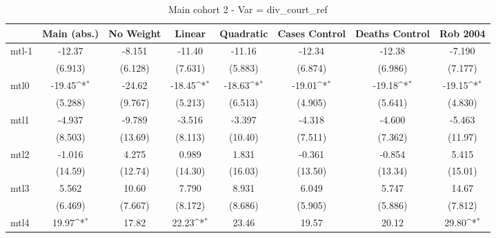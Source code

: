 \documentclass{article}
\begin{document}
{
\def\sym#1{\ifmmode^{#1}\else\(^{#1}\)\fi}
\begin{longtable}{l*{7}{c}}
\caption{Main cohort 2 - Var = div\_court\_ref}\\
\hline\hline\endfirsthead\hline\endhead\hline\endfoot\endlastfoot
                &\multicolumn{1}{c}{Main (abs.)}&\multicolumn{1}{c}{No Weight}&\multicolumn{1}{c}{Linear}&\multicolumn{1}{c}{Quadratic}&\multicolumn{1}{c}{Cases Control}&\multicolumn{1}{c}{Deaths Control}&\multicolumn{1}{c}{Rob 2004}\\
\hline
mtl-1           &   -12.37         &   -8.151         &   -11.40         &   -11.16         &   -12.34         &   -12.38         &   -7.190         \\
                &  (6.913)         &  (6.128)         &  (7.631)         &  (5.883)         &  (6.874)         &  (6.986)         &  (7.177)         \\
mtl0            &   -19.45\sym{*}  &   -24.62         &   -18.45\sym{*}  &   -18.63\sym{*}  &   -19.01\sym{*}  &   -19.18\sym{*}  &   -19.15\sym{*}  \\
                &  (5.288)         &  (9.767)         &  (5.213)         &  (6.513)         &  (4.905)         &  (5.641)         &  (4.830)         \\
mtl1            &   -4.937         &   -9.789         &   -3.516         &   -3.397         &   -4.318         &   -4.600         &   -5.463         \\
                &  (8.503)         &  (13.69)         &  (8.113)         &  (10.40)         &  (7.511)         &  (7.362)         &  (11.97)         \\
mtl2            &   -1.016         &    4.275         &    0.989         &    1.831         &   -0.361         &   -0.854         &    5.415         \\
                &  (14.59)         &  (12.74)         &  (14.30)         &  (16.03)         &  (13.50)         &  (13.34)         &  (15.01)         \\
mtl3            &    5.562         &    10.60         &    7.790         &    8.931         &    6.049         &    5.747         &    14.67         \\
                &  (6.469)         &  (7.667)         &  (8.172)         &  (8.686)         &  (5.905)         &  (5.886)         &  (7.812)         \\
mtl4            &    19.97\sym{*}  &    17.82         &    22.23\sym{*}  &    23.46         &    19.57         &    20.12         &    29.80\sym{*}  \\

\end{longtable}}
\end{document}
